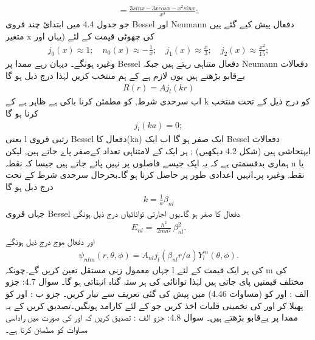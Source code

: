 \begin{align}
=\frac{3sinx-3xcosx-x^{2}sinx}{x^{3}}: 
\end{align}
جو جدول 4.4 میں ابتدائ چند قروی Bessel اور Neumann دفعال پیش کیے گئے ہیں متغیر x کی چھوٹی قیمت کے لئے (یہاں
اور
\begin{align}
j_{0}(x)\approx1;\quad{n_{0}(x)\approx-\frac{1}{x}};\quad{j_{1}(x)\approx\frac{x}{3}};\quad{j_{2}(x)\approx\frac{x^{2}}{15}}; 
\end{align}
وغیرہ ہونگے۔ دیہان رہے ممدا پر Bessel دفعال متناہی رہتے ہیں جبکہ Neumann دفعالات بےقابو بڑھتے ہیں یوں لازم ہے کے ہم
منتخب کریں لہٰذا درج ذیل ہو گا
\begin{align}
R(r)=Aj_{l}(kr) 
\end{align}
اب سرحدی شرط,
کو مطمئن کرنا باکی ہے ظاہر ہے کے k کو درج ذیل کے تحت منتخب کرنا ہو گا
\begin{align}
j_{l}(ka)=0; 
\end{align}
یعنی l رتبی قروی Bessel دفعال کا(ka) ایک صفر ہو گا اب ایک Bessel دفعالات ایہتحاشی ہیں (شکل 4.2 دیکھیں) ; ہر ایک کے لامتناہی تعداد کےصفر پاے جاتے ہیں, لیکن ہماری بدقسمتی ہے کہ یہ ایک جیسے فاصلوں پر نہیں پائے جاتے ہیں جیسا کہ نقطہ n یا نقطہ
وغیرہ پر۔انہیں اعدادی طور پر حاصل کرنا ہو گا۔بحرحال سرحدی شرط کے تحت درج ذیل ہو گا
\begin{align}
k=\frac{1}{a}\beta_{nl} 
\end{align}
جہاں
قروی Bessel دفعال کا
صفر
ہو گا۔یوں اجارتی توانائیاں درج ذیل ہونگی
\begin{align}
E_{nl}=\frac{\hslash^{2}}{2ma^{2}}\beta_{nl}^{2}. 
\end{align}
اور دفعال موج درج ذیل ہونگے 
\begin{align}
\psi_{nlm}(r,\theta,\phi)=A_{nl}j_{l}(\beta_{nl}r/a)Y_{l}^{m}(\theta,\phi). 
\end{align}
جہاں معمول زنی مستقل 
 تعین کریں گے۔چونکہ l کی ہر ایک قیمت کے لئے m کی
مختلف قیمتیں پای جاتی ہیں لہٰذا توانائی کی ہر ستہ
گناہ انہتاتی ہو گا۔
سوال 4.7:
جزو الف :
اور
کو (مساوات 4.46) میں پیش کی گئی تعریف سے تیار کریں۔
جزو ب :
اور
کو پھیلا کر
اور
کی تخمینی قلیات اخذ کریں جو
کے لئے كارامد ہونگیں۔تصدیق کریں کے یہ ممدا پر بےقابو بڑھتے ہیں۔
سوال 4.8:
جزو الف : تصدیق کریں کہ
اور
کی صورت میں
راداسی مساوات کو مطمئن كرتا ہے۔
